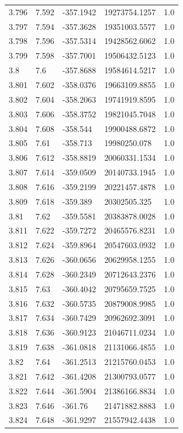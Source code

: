 \begin{tabular}{lllll}
3.796 & 7.592 & -357.1942 & 19273754.1257 & 1.0 \\
3.797 & 7.594 & -357.3628 & 19351003.5577 & 1.0 \\
3.798 & 7.596 & -357.5314 & 19428562.6062 & 1.0 \\
3.799 & 7.598 & -357.7001 & 19506432.5123 & 1.0 \\
3.8 & 7.6 & -357.8688 & 19584614.5217 & 1.0 \\
3.801 & 7.602 & -358.0376 & 19663109.8855 & 1.0 \\
3.802 & 7.604 & -358.2063 & 19741919.8595 & 1.0 \\
3.803 & 7.606 & -358.3752 & 19821045.7048 & 1.0 \\
3.804 & 7.608 & -358.544 & 19900488.6872 & 1.0 \\
3.805 & 7.61 & -358.713 & 19980250.078 & 1.0 \\
3.806 & 7.612 & -358.8819 & 20060331.1534 & 1.0 \\
3.807 & 7.614 & -359.0509 & 20140733.1945 & 1.0 \\
3.808 & 7.616 & -359.2199 & 20221457.4878 & 1.0 \\
3.809 & 7.618 & -359.389 & 20302505.325 & 1.0 \\
3.81 & 7.62 & -359.5581 & 20383878.0028 & 1.0 \\
3.811 & 7.622 & -359.7272 & 20465576.8231 & 1.0 \\
3.812 & 7.624 & -359.8964 & 20547603.0932 & 1.0 \\
3.813 & 7.626 & -360.0656 & 20629958.1255 & 1.0 \\
3.814 & 7.628 & -360.2349 & 20712643.2376 & 1.0 \\
3.815 & 7.63 & -360.4042 & 20795659.7525 & 1.0 \\
3.816 & 7.632 & -360.5735 & 20879008.9985 & 1.0 \\
3.817 & 7.634 & -360.7429 & 20962692.3091 & 1.0 \\
3.818 & 7.636 & -360.9123 & 21046711.0234 & 1.0 \\
3.819 & 7.638 & -361.0818 & 21131066.4855 & 1.0 \\
3.82 & 7.64 & -361.2513 & 21215760.0453 & 1.0 \\
3.821 & 7.642 & -361.4208 & 21300793.0577 & 1.0 \\
3.822 & 7.644 & -361.5904 & 21386166.8834 & 1.0 \\
3.823 & 7.646 & -361.76 & 21471882.8883 & 1.0 \\
3.824 & 7.648 & -361.9297 & 21557942.4438 & 1.0 \\

\end{tabular}
